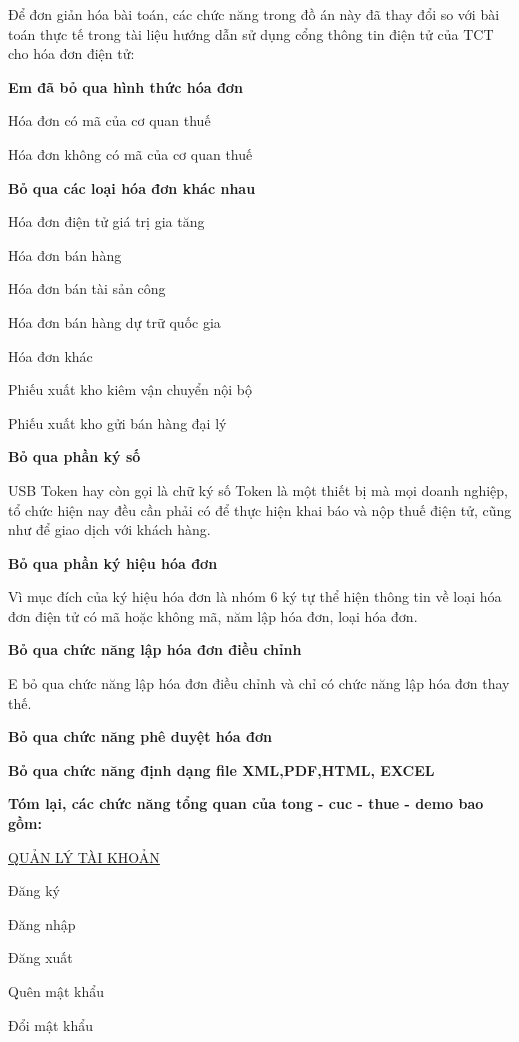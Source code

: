 Để đơn giản hóa bài toán, các chức năng trong đồ án này đã thay đổi so với bài toán thực tế trong tài liệu hướng dẫn sử dụng cổng thông tin điện tử của TCT cho hóa đơn điện tử:

\textbf{Em đã bỏ qua hình thức hóa đơn}

Hóa đơn có mã của cơ quan thuế

Hóa đơn không có mã của cơ quan thuế

\textbf{Bỏ qua các loại hóa đơn khác nhau}

Hóa đơn điện tử giá trị gia tăng

Hóa đơn bán hàng

Hóa đơn bán tài sản công

Hóa đơn bán hàng dự trữ quốc gia

Hóa đơn khác

Phiếu xuất kho kiêm vận chuyển nội bộ

Phiếu xuất kho gửi bán hàng đại lý

\textbf{Bỏ qua phần ký số}

USB Token hay còn gọi là chữ ký số Token là một thiết bị mà mọi doanh nghiệp, tổ chức hiện nay đều cần phải có để thực hiện khai báo và nộp thuế điện tử, cũng như để giao dịch với khách hàng.

\textbf{Bỏ qua phần ký hiệu hóa đơn}

Vì mục đích của ký hiệu hóa đơn là nhóm 6 ký tự thể hiện thông tin về loại hóa đơn điện tử có mã hoặc không mã, năm lập hóa đơn, loại hóa đơn.

\textbf{Bỏ qua chức năng lập hóa đơn điều chỉnh}

E bỏ qua chức năng lập hóa đơn điều chỉnh và chỉ có chức năng lập hóa đơn thay thế.

\textbf{Bỏ qua chức năng phê duyệt hóa đơn}

\textbf{Bỏ qua chức năng định dạng file XML,PDF,HTML, EXCEL}

\textbf{Tóm lại, các chức năng tổng quan của tong - cuc - thue - demo bao gồm:}

\underline{\textsc{QUẢN LÝ TÀI KHOẢN}}

Đăng ký



Đăng nhập

Đăng xuất

Quên mật khẩu



Đổi mật khẩu

